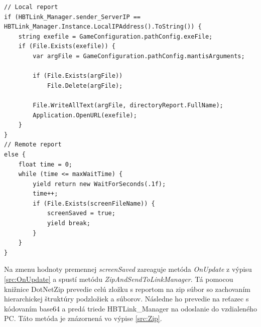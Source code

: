 \documentclass[slovak, bachelorpractice]{diploma}
\begin{document}
\vspace{10pt}
\begin{lstlisting}[label=src:Report,caption={Vytváranie lokálneho a vzdialeného reportu}]
// Local report
if (HBTLink_Manager.sender_ServerIP == HBTLink_Manager.Instance.LocalIPAddress().ToString()) {
    string exefile = GameConfiguration.pathConfig.exeFile;
    if (File.Exists(exefile)) {
        var argFile = GameConfiguration.pathConfig.mantisArguments;

        if (File.Exists(argFile))
            File.Delete(argFile);

        File.WriteAllText(argFile, directoryReport.FullName);
        Application.OpenURL(exefile);
    }
}
// Remote report
else {
    float time = 0;
    while (time <= maxWaitTime) {
        yield return new WaitForSeconds(.1f);
        time++;
        if (File.Exists(screenFileName)) {
            screenSaved = true;
            yield break;
        }
    }
}
\end{lstlisting}

Na zmenu hodnoty premennej \textit{screenSaved} zareaguje metóda \textit{OnUpdate} z výpisu \ref{src:OnUpdate} a spustí metódu \textit{ZipAndSendToLinkManager}. Tá pomocou knižnice DotNetZip \cite{DotNetZip} prevedie celú zložku s reportom na zip súbor so zachovaním hierarchickej štruktúry podzložiek a súborov. Následne ho prevedie na reťazec s kódovaním base64 a predá triede HBTLink\_Manager na odoslanie do vzdialeného PC. Táto metóda je znázornená vo výpise \ref{src:Zip}. 
\end{document}
